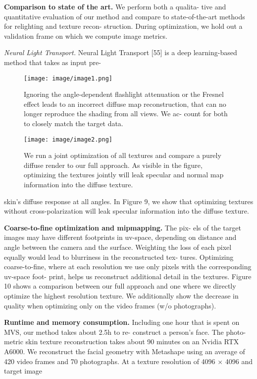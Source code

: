 \documentclass[twocolumn]{article}
\begin{document}
\textbf{Comparison to state of the art.} We perform both a qualita-
tive and quantitative evaluation of our method and compare
to state-of-the-art methods for relighting and texture recon-
struction. During optimization, we hold out a validation
frame on which we compute image metrics.

\indent \textit{Neural Light Transport.} Neural Light Transport [55]
is a deep learning-based method that takes as input pre-

\newpage
\begin{figure}
    \texttt{[image: image/image1.png]}
    \caption{Ignoring the angle-dependent ﬂashlight attenuation or
the Fresnel effect leads to an incorrect diffuse map reconstruction,
that can no longer reproduce the shading from all views. We ac-
count for both to closely match the target data.}
    \label{fig:Figure 8}
\end{figure}

\begin{figure}
    \texttt{[image: image/image2.png]}
    \caption{We run a joint optimization of all textures and compare a
purely diffuse render to our full approach. As visible in the ﬁgure,
optimizing the textures jointly will leak specular and normal map
information into the diffuse texture.}
    \label{fig:Figure 9}
\end{figure}

skin’s diffuse response at all angles. In Figure 9, we show
that optimizing textures without cross-polarization will leak
specular information into the diffuse texture.
\newline

\noindent \textbf{Coarse-to-ﬁne optimization and mipmapping.} The pix-
els of the target images may have different footprints in
uv-space, depending on distance and angle between the
camera and the surface. Weighting the loss of each pixel
equally would lead to blurriness in the reconstructed tex-
tures. Optimizing coarse-to-ﬁne, where at each resolution
we use only pixels with the corresponding uv-space foot-
print, helps us reconstruct additional detail in the textures.
Figure 10 shows a comparison between our full approach
and one where we directly optimize the highest resolution
texture. We additionally show the decrease in quality when
optimizing only on the video frames (w/o photographs).

\newline

\noindent \textbf{Runtime and memory consumption.} Including one hour
that is spent on MVS, our method takes about 2.5h to re-
construct a person’s face. The photo-metric skin texture
reconstruction takes about 90 minutes on an Nvidia RTX
A6000. We reconstruct the facial geometry with Metashape
using an average of 420 video frames and 70 photographs.
At a texture resolution of 4096 × 4096 and target image
\maketitle
{\small


}
\end{document}
